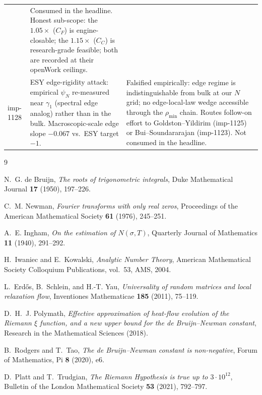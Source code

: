 \documentclass[11pt,a4paper]{article}
\theoremstyle{definition}
\newcommand{\rhomin}{\rho_{\min}}
\begin{document}
\begin{table}[h]
\begin{tabular}{@{}p{} p{} p{}@{}}
             & Consumed in the headline. Honest sub-scope: the $1.05\times$
      ($C_F$) is engine-closable; the $1.15\times$ ($C_C$) is
      research-grade feasible; both are recorded at their openWork
      ceilings. \\[2pt]
    imp-1128 & ESY edge-rigidity attack: empirical $\psi_N$
      re-measured near $\gamma_1$ (spectral edge analog) rather than
      in the bulk. Macroscopic-scale edge slope $-0.067$ vs.\ ESY
      target $-1$.
             & Falsified empirically: edge regime is indistinguishable
      from bulk at our $N$ grid; no edge-local-law wedge accessible
      through the $\rhomin$ chain. Routes follow-on effort to
      Goldston--Yildirim (imp-1125) or Bui--Soundararajan
      (imp-1123). Not consumed in the headline. \\
    \bottomrule
  \end{tabular}
\end{table}

\begin{thebibliography}{9}

N.~G. de Bruijn,
\emph{The roots of trigonometric integrals},
Duke Mathematical Journal \textbf{17} (1950), 197--226.

C.~M. Newman,
\emph{Fourier transforms with only real zeros},
Proceedings of the American Mathematical Society \textbf{61} (1976),
245--251.

A.~E. Ingham,
\emph{On the estimation of $N(\sigma, T)$},
Quarterly Journal of Mathematics \textbf{11} (1940), 291--292.

H.~Iwaniec and E.~Kowalski,
\emph{Analytic Number Theory},
American Mathematical Society Colloquium Publications, vol.~53, AMS, 2004.

L.~Erd\H{o}s, B.~Schlein, and H.-T. Yau,
\emph{Universality of random matrices and local relaxation flow},
Inventiones Mathematicae \textbf{185} (2011), 75--119.

D.~H.~J. Polymath,
\emph{Effective approximation of heat-flow evolution of the Riemann $\xi$
function, and a new upper bound for the de Bruijn--Newman constant},
Research in the Mathematical Sciences (2018).

B.~Rodgers and T.~Tao,
\emph{The de Bruijn--Newman constant is non-negative},
Forum of Mathematics, Pi \textbf{8} (2020), e6.

D.~Platt and T.~Trudgian,
\emph{The Riemann Hypothesis is true up to $3 \cdot 10^{12}$},
Bulletin of the London Mathematical Society \textbf{53} (2021), 792--797.

\end{thebibliography}
\end{document}
